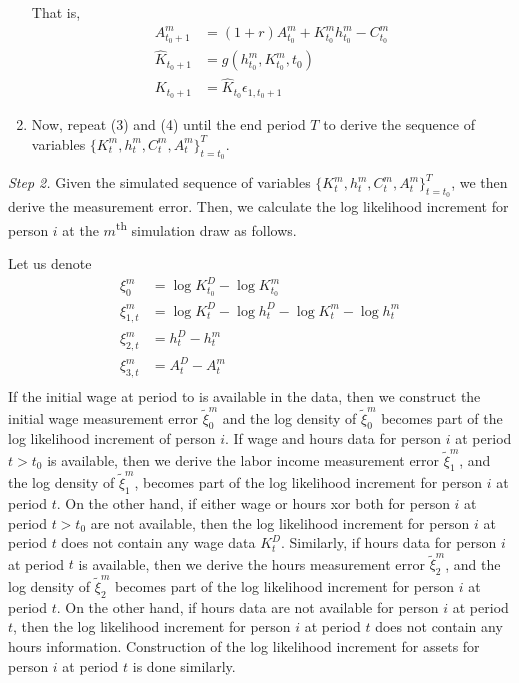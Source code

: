 \documentclass[\econtexRoot/ImaiKeane]{subfiles}
\begin{document}
\begin{enumerate}
      That is,
       \begin{equation*}
        \begin{split}
          A_{t_0+1}^m & = (1+r)A_{t_0}^m + K_{t_0}^m h_{t_0}^m - C_{t_0}^m \\
          \hat{K}_{t_0+1}& = g(h_{t_0}^m,  K_{t_0}^m, t_0) \\
           K_{t_0+1} & =  \hat{K}_{t_0} \epsilon_{1,t_0+1}
        \end{split}
      \end{equation*}
    \item Now, repeat (3) and (4) until the end period $T$ to derive the sequence of variables $\{K_t^m,h_t^m,C_t^m,A_t^m\}_{t=t_0}^T$.
    \end{enumerate}
    \textit{Step 2.}     Given the simulated sequence of variables $\{K_t^m,h_t^m,C_t^m,A_t^m\}_{t=t_0}^T$, we then derive the measurement error. Then, we calculate the log likelihood increment for person $i$  at the $m$\textsuperscript{th} simulation draw as follows.\par
    Let us denote
           \begin{equation*}
        \begin{split}
          \xi_0^m &= \log K_{t_0}^D - \log K_{t_0}^m \\
          \xi_{1,t}^m &= \log K_t^D - \log h_t^D - \log K_t^m - \log h_t^m \\
          \xi_{2,t}^m &= h_t^D - h_t^m \\
           \xi_{3,t}^m &=  A_t^D - A_t^m \\
        \end{split}
      \end{equation*}
If the initial wage at period to is available in the data, then we construct the initial wage measurement error $\tilde{\xi}_0^m$ and the log density of $\tilde{\xi}_0^m$ becomes part of the log likelihood increment of person $i$. If wage and hours data for person $i$ at period $t > t_0$ is available, then we derive the labor income measurement error  $\tilde{\xi}_1^m$, and the log density of  $\tilde{\xi}_1^m$, becomes part of the log likelihood increment for person $i$ at period $t$. On the other hand, if either wage or hours xor both for person $i$ at period $t > t_0$ are not available, then the log likelihood increment for person $i$ at period $t$ does not contain any wage data $K_t^D$. Similarly, if hours data for person $i$ at period $t$ is available, then we derive the hours measurement error $\tilde{\xi}_2^m$, and the log density of $\tilde{\xi}_2^m$ becomes part of the log likelihood increment for person $i$ at period $t$. On the other hand, if hours data are not available for person $i$ at period $t$, then the log likelihood increment for person $i$ at period $t$ does not contain any hours information. Construction of the log likelihood increment for assets for person $i$ at period $t$ is done similarly. \par
\end{document}
